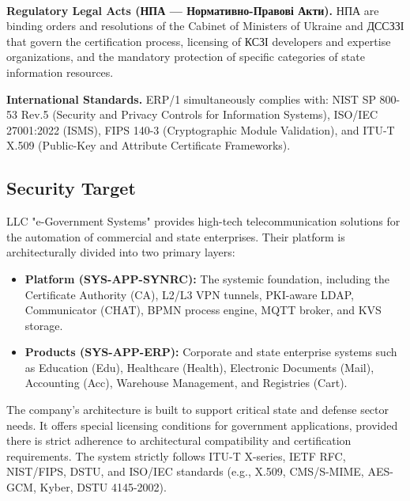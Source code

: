 \documentclass{article}
\begin{document}
\paragraph{}

\textbf{Regulatory Legal Acts (\foreignlanguage{ukrainian}{НПА} --- {Нормативно-Правові Акти}).}
\foreignlanguage{ukrainian}{НПА} are binding orders and resolutions of the Cabinet of Ministers of Ukraine and \foreignlanguage{ukrainian}{ДССЗЗІ} that govern the certification process, licensing of \foreignlanguage{ukrainian}{КСЗІ} developers and expertise organizations, and the mandatory protection of specific categories of state information resources.

\textbf{International Standards.}
ERP/1 simultaneously complies with: NIST SP 800-53 Rev.5 (Security and Privacy Controls for Information Systems), ISO/IEC 27001:2022 (ISMS), FIPS 140-3 (Cryptographic Module Validation), and ITU-T X.509 (Public-Key and Attribute Certificate Frameworks).

\newpage
\subsection{Security Target}

LLC "e-Government Systems" provides high-tech telecommunication solutions for the automation of commercial and state enterprises.
Their platform is architecturally divided into two primary layers:

\begin{itemize}
    \item \textbf{Platform (SYS-APP-SYNRC):} The systemic foundation, including the Certificate Authority (CA), L2/L3 VPN tunnels, PKI-aware LDAP, Communicator (CHAT), BPMN process engine, MQTT broker, and KVS storage.
    \item \textbf{Products (SYS-APP-ERP):} Corporate and state enterprise systems such as Education (Edu), Healthcare (Health), Electronic Documents (Mail), Accounting (Acc), Warehouse Management, and Registries (Cart).
\end{itemize}

The company's architecture is built to support critical state and defense sector needs.
It offers special licensing conditions for government applications,
provided there is strict adherence to architectural compatibility and certification requirements.
The system strictly follows ITU-T X-series, IETF RFC, NIST/FIPS, DSTU,
and ISO/IEC standards (e.g., X.509, CMS/S-MIME, AES-GCM, Kyber, DSTU 4145-2002).
\end{document}
